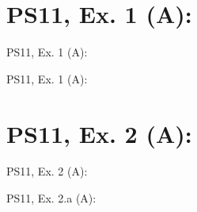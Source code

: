 \section{PS11, Ex. 1 (A): }

\begin{frame}{PS11, Ex. 1 (A): }
    \begin{multicols}{2}
      \vfill\null\columnbreak
      \vfill\null
    \end{multicols}
\end{frame}

\begin{frame}{PS11, Ex. 1 (A): }
    \begin{multicols}{2}
      \vfill\null\columnbreak
      \vfill\null
    \end{multicols}
\end{frame}



\section{PS11, Ex. 2 (A): }

\begin{frame}{PS11, Ex. 2 (A): }
    \begin{multicols}{2}
      \vfill\null\columnbreak
      \vfill\null
    \end{multicols}
\end{frame}

\begin{frame}{PS11, Ex. 2.a (A): }
    \begin{multicols}{2}
      \vfill\null\columnbreak
      \vfill\null
    \end{multicols}
\end{frame}

